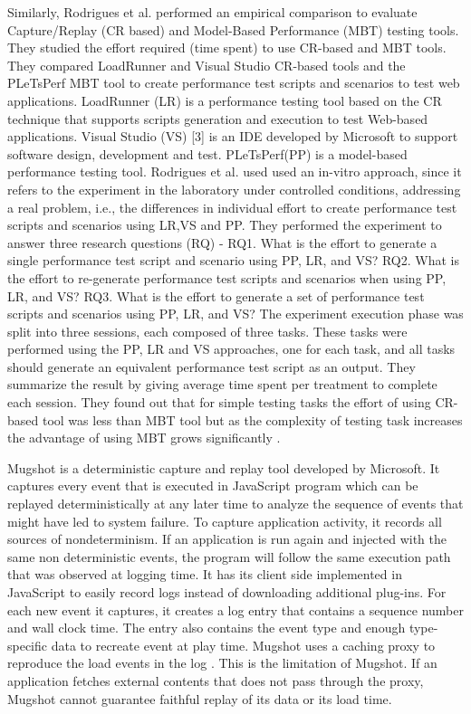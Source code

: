 \documentclass[12pt,journal]{IEEEtran}
\begin{document}
Similarly, Rodrigues et al. performed an empirical comparison to evaluate Capture/Replay (CR based) and Model-Based Performance (MBT) testing tools. They studied the effort required (time spent) to use CR-based and MBT tools. They compared LoadRunner and Visual Studio CR-based tools and the PLeTsPerf MBT tool to create performance test scripts and scenarios to test web applications. LoadRunner (LR) is a performance testing tool based on the CR technique that supports scripts generation and execution to test Web-based applications. Visual Studio (VS) [3] is an IDE developed by Microsoft to support software design, development and test. PLeTsPerf(PP) is a model-based performance testing tool. Rodrigues et al. used used an in-vitro approach, since it refers to the experiment in the laboratory under controlled conditions, addressing a real problem, i.e., the differences in individual effort to create performance test scripts and scenarios using LR,VS and PP. They performed the experiment to answer three research questions (RQ) - RQ1. What is the effort to generate a single performance test script and scenario using PP, LR, and VS? RQ2. What is the effort to re-generate performance test scripts and scenarios when using PP, LR, and VS? RQ3. What is the effort to generate a set of performance test scripts and scenarios using PP, LR, and VS? The experiment execution phase was split into three sessions, each composed of three tasks. These tasks were performed using the PP, LR  and VS approaches, one for each task, and all tasks should generate an equivalent performance test script as an output. They summarize the result by giving average time spent per treatment to complete each session. They found out that for simple testing tasks the effort of using CR-based tool was less than MBT tool but as the complexity of testing task increases the advantage of using MBT grows significantly \cite{Rodrigues:2014:ECR:2652524.2652587}.
\par
Mugshot is a deterministic capture and replay tool developed by Microsoft. It captures every event that is executed in JavaScript program which can be replayed deterministically at any later time to analyze the sequence of events that might have led to system failure. To capture application activity, it records all sources of nondeterminism. If an application is run again and injected with the same non deterministic events, the program will follow the same execution path that was observed at logging time. It has its client side implemented in JavaScript to easily record logs instead of downloading additional plug-ins. For each new event it captures, it creates a log entry that contains a sequence number and wall clock time. The entry also contains the event type and enough type-specific data to recreate event at play time. Mugshot uses a caching proxy to reproduce the load events in the log \cite{Mickens:2010:MDC:1855711.1855722}. This is the limitation of Mugshot. If an application fetches external contents that does not pass through the proxy, Mugshot cannot guarantee faithful replay of its data or its load time.
\end{document}
